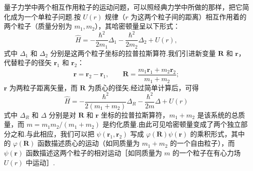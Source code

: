 量子力学中两个相互作用粒子的运动问题，可以照经典力学中所做的那样，把它简化成为一个单粒子问题.按 $U(r)$ 规律（$r$ 为这两个粒子间的距离）相互作用着的两个粒子（质量分别为 $m_1,m_2$），其哈密顿量呈以下形式：
\begin{equation}
  \hat{H}=-\frac{\hbar^2}{2m_1}\Delta_1-\frac{\hbar^2}{2m_2}\Delta_2+U(r),
\end{equation}
式中 $\Delta_1$ 和 $\Delta_2$ 分别是这两个粒子坐标的拉普拉斯算符.我们引进新变量 $\boldsymbol{R}$ 和 $\boldsymbol{r}$，代替粒子的径矢 $\boldsymbol{r}_1$ 和 $\boldsymbol{r}_2$：
\begin{equation}
  \boldsymbol{r}=\boldsymbol{r}_2-\boldsymbol{r}_1,\qquad
  \boldsymbol{R}=\frac{m_1\boldsymbol{r}_1+m_2\boldsymbol{r}_2}{m_1+m_2};
\end{equation}
$\boldsymbol{r}$ 为两粒子距离矢量，而 $\boldsymbol{R}$ 为质心的径矢.经过简单计算后，可得
\begin{equation}
  \hat{H}=-\frac{\hbar^2}{2(m_1+m_2)}\Delta_R-\frac{\hbar^2}{2m}\Delta+U(r)
\end{equation}
式中 $\Delta_R$ 和 $\Delta$ 分别是对 $\boldsymbol{R}$ 和 $\boldsymbol{r}$ 坐标的拉普拉斯算符，$m_1+m_2$ 是该系统的总质量，而 $m=m_1m_2/(m_1+m_2)$ 是约化质量.由此可见哈密顿量变成了两个独立部分之和.与此相应，我们可以把 $\psi(\boldsymbol{r}_1,\boldsymbol{r}_2)$ 写成 $\varphi(\boldsymbol{R})\psi(\boldsymbol{r})$ 的乘积形式，其中的 $\varphi(\boldsymbol{R})$ 函数描述质心的运动（如同质量为 $m_1+m_2$ 的一个自由粒子），而 $\psi(\boldsymbol{r})$ 函数描述这两个粒子的相对运动［如同质量为 $m$ 的一个粒子在有心力场 $U(r)$ 中运动］.

